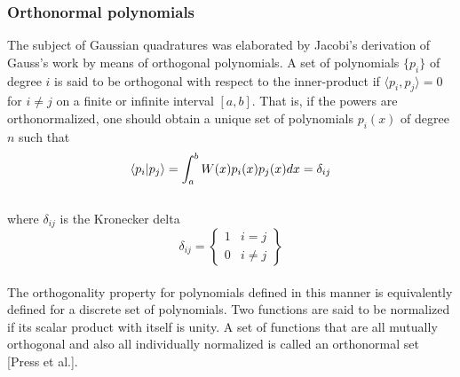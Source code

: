\documentclass[%
reprint,
amsmath,amssymb,
aps,
]{revtex4-1}
\begin{document}
\subsubsection*{Orthonormal polynomials} \noindent 
The subject of Gaussian quadratures was elaborated by Jacobi's derivation of Gauss's work by means of orthogonal polynomials. A set of polynomials $\{p_i\}$ of degree $i$ is said to be orthogonal with respect to the inner-product if $\langle p_i, p_j \rangle = 0$ for $i\not = j$ on a finite or infinite interval $[a,b]$. That is, if the powers are orthonormalized, one should obtain a unique set of polynomials $p_i(x)$ of degree $n$ such that \vspace{2mm} \\
\begin{equation*}
	\braket{p_i}{p_j} = 
	\int_{a}^{b} W(x)p_i(x)p_j(x)dx = \delta_{ij} 
\end{equation*}\vspace{2mm} \\
where $\delta_{ij}$ is the Kronecker delta\vspace{1mm} \\
\begin{equation*}
	\delta_{ij} = \left\{
	\begin{array}{ll}
	1 & i = j\\
	0 & i \not =j 
	\end{array} \right\}
\end{equation*}\vspace{1mm} \\
The orthogonality property for polynomials defined in this manner is equivalently defined for a discrete set of polynomials. Two functions are said to be normalized if its scalar product with itself is unity. A set of functions that are all mutually orthogonal and also all  individually normalized is called an orthonormal set [Press et al.].
\end{document}
